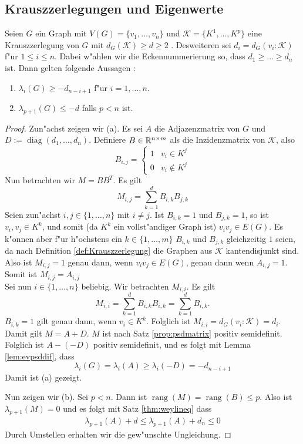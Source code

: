 \subsection{Krauszzerlegungen und Eigenwerte}

\begin{theorem}
  \label{thm:KrauszEigenwerte}
  Seien $G$ ein Graph mit $V(G)=\{v_1,\dots,v_n\}$ und $\mathcal K=\{K^1,\dots,K^p\}$ eine Krauszzerlegung von $G$ mit $d_G(\mathcal K) \geq d \geq 2$ . Desweiteren sei $d_i = d_G(v_{i}:\mathcal K)$ f"ur $1\leq i \leq n$. 
  Dabei w"ahlen wir die Eckennummerierung so, dass $d_1 \geq \dots \geq d_{n}$ ist.
  Dann gelten folgende Aussagen : 
  \begin{enumerate}[label=\rm{(\alph*)}]
    \item $\lambda_i(G) \geq -d_{n-i+1}$ f"ur $i = 1, \dots , n$.
    \item $\lambda_{p+1}(G) \leq -d$ falls $p < n$ ist.
  \end{enumerate}
\end{theorem}
\begin{proof}
  Zun"achst zeigen wir (a). Es sei $A$ die Adjazenzmatrix von $G$ und $D := \operatorname{diag}(d_1,\dots,d_n)$. Definiere $B\in{\mathbb{R}}^{n\times m}$ als die Inzidenzmatrix von $\mathcal K$, also $$B_{i,j} = \begin{cases}
    1 & v_i \in K^j \\ 0 & v_i \notin K^j
  \end{cases}$$ 
  Nun betrachten wir $M=BB^{T}$. Es gilt
  \[
    M_{i,j} = \sum\limits_{k=1}^{d}B_{i,k}B_{j,k}
  \]
  Seien zun"achst $i,j \in \{1,\dots,n\}$ mit $i\neq j$. Ist $B_{i,k} = 1$ und $B_{j,k} = 1$, so ist $v_i,v_j  \in K^k$, und somit (da $K^k$ ein vollst"andiger Graph ist) $v_iv_j\in E(G)$. Es k"onnen aber f"ur h"ochstens ein $k\in \{1,\dots,m\}$ $B_{i,k}$ und $B_{j,k}$ gleichzeitig $1$ seien, da nach Definition \ref{def:Krauszzerlegung} die Graphen aus $\mathcal K$ kantendisjunkt sind. Also ist $M_{i,j}= 1 $ genau dann, wenn $v_iv_j\in E(G)$, genau dann wenn $A_{i,j} = 1$. Somit ist $M_{i,j}=A_{i,j}$\\
  Sei nun $i\in\{1,\dots,n\}$ beliebig. Wir betrachten $M_{i,i}$. Es gilt 
  \[
    M_{i,i} = \sum\limits_{k=1}^{d}B_{i,k}B_{i,k} = \sum\limits_{k=1}^{d} B_{i,k}.
  \]
  $B_{i,k}=1$ gilt genau dann, wenn $v_i \in K^k$. Folglich ist $M_{i,i}= d_G(v_i:\mathcal K)= d_i$. Damit gilt $M=A+D$. $M$ ist nach Satz \ref{prop:psdmatrix} positiv semidefinit.
  Folglich ist $A- (-D)$ positiv semidefinit, und es folgt mit Lemma \ref{lem:evpsddif}, dass 
  \begin{equation*}
    \lambda_i(G) = \lambda_i(A) \geq \lambda_i(-D) = -d_{n-i+1}
  \end{equation*}
  Damit ist (a) gezeigt.

  Nun zeigen wir (b). Sei $p<n$. Dann ist $\operatorname{rang}(M)= \operatorname{rang}(B) \leq p$. Also ist $\lambda_{p+1}(M) = 0$ und es folgt mit Satz \ref{thm:weylineq} dass 
  \begin{align*}
    \lambda_{p+1}(A) + d \leq \lambda_{p+1}(A) + d_{n} \leq 0
  \end{align*}
  Durch Umstellen erhalten wir die gew"unschte Ungleichung.
\end{proof}
